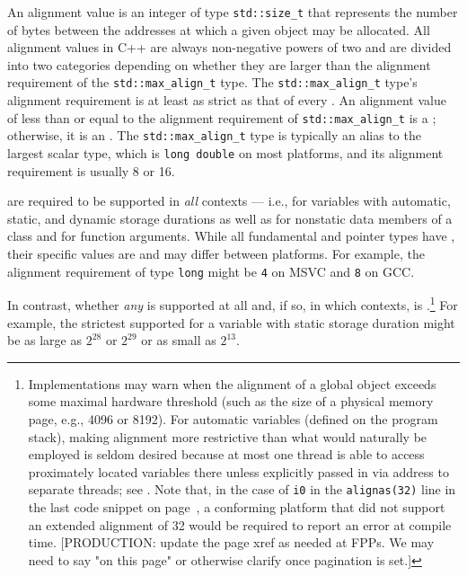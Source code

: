 An alignment value is an integer of type \lstinline!std::size_t! that represents the number of bytes between the addresses at which a given object may be allocated.  All alignment values in C++ are always non-negative powers of two and are divided into two categories depending on whether they are larger than the alignment requirement of the \lstinline!std::max_align_t! type.  The \lstinline!std::max_align_t! type's alignment requirement is at least as strict as that of every .  An alignment value of less than or equal to the alignment requirement of \lstinline!std::max_align_t! is a ; otherwise, it is an .  The \lstinline!std::max_align_t! type is typically an alias to the largest scalar type, which is \lstinline!long double! on most platforms, and its alignment requirement is usually 8 or 16.

 are required to be supported in \emph{all} contexts --- i.e., for variables with automatic, static, and dynamic storage durations as well as for nonstatic data members of a class and for function arguments.  While all fundamental and pointer types have , their specific values are  and may differ between platforms.  For example, the alignment requirement of type \lstinline!long! might be \lstinline!4! on MSVC and \lstinline!8! on GCC.

In contrast, whether \emph{any}  is supported at all and, if so, in which contexts, is .\footnote{Implementations may warn when the alignment of a global object exceeds some maximal hardware threshold (such as the size of a physical memory page, e.g., 4096 or 8192).  For automatic variables (defined on the program stack), making alignment more restrictive than what would naturally be employed is seldom desired because at most one thread is able to access proximately located variables there unless explicitly passed in via address to separate threads; see . Note that, in the case of \lstinline!i0! in the \lstinline!alignas(32)! line in the last code snippet on page~\pageref{fnref}, a conforming platform that did not support an extended alignment of 32 would be required to report an error at compile time. [PRODUCTION: update the page xref as needed at FPPs. We may need to say "on this page" or otherwise clarify once pagination is set.]} For example, the strictest supported  for a variable with static storage duration might be as large as $2^{28}$ or $2^{29}$ or as small as $2^{13}$.

